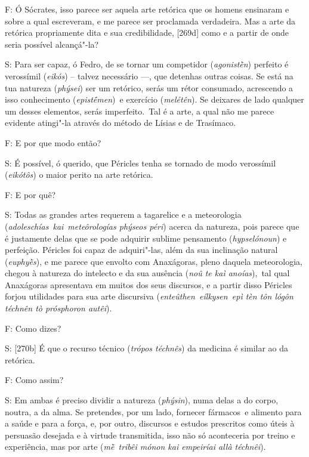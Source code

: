  

F: Ó Sócrates, isso parece ser aquela arte retórica que os homens
ensinaram e sobre a qual escreveram, e me parece ser proclamada
verdadeira. Mas a arte da retórica propriamente dita e sua
credibilidade, [269d] como e a partir de onde seria possível
alcançá"-la?

 

S: Para ser capaz, ó Fedro, de se tornar um competidor
(\emph{agonistḕn}) perfeito é verossímil (\emph{eikós}) -- talvez
necessário \mbox{---,} que detenhas outras coisas. Se está na tua natureza
(\emph{phýsei}) ser um retórico, serás um rétor consumado, acrescendo a
isso conhecimento (\emph{epistḗmen})\emph{~}e exercício
(\emph{melétên}). Se deixares de lado qualquer um desses elementos,
serás imperfeito.~Tal é a arte, a qual não me parece evidente atingi"-la
através do método de Lísias e de Trasímaco.

 

F: E por que modo então?

 

S: É possível, ó querido, que Péricles tenha se tornado de modo
verossímil (\emph{eikótôs}) o maior perito na arte retórica.

 

F: E por quê?

 

S: Todas as grandes artes requerem a tagarelice e a meteorologia
(\emph{adoleschías}~\emph{kai}~\emph{meteôrologías phýseos péri}) acerca
da natureza, pois parece que é justamente delas que se pode adquirir
sublime pensamento (\emph{hypselónoun}) e perfeição. Péricles foi capaz
de adquiri"-las, além da sua inclinação natural (\emph{euphyḕs}), e me
parece que envolto com Anaxágoras, pleno daquela meteorologia, chegou à
natureza do intelecto e da sua ausência (\emph{noû te kaì anoías}),~tal
qual Anaxágoras apresentava em muitos dos seus discursos, e a partir
disso Péricles forjou utilidades para sua arte discursiva
(\emph{enteûthen~eílkysen~epì tèn tôn lógôn téchnên tò prósphoron
autêi}).

 

F: Como dizes?

 

S: [270b] É que o recurso técnico (\emph{trópos téchnês}) da
medicina é similar ao da retórica.

 

F: Como assim?

 

S: Em ambas é preciso dividir a natureza (\emph{phýsin}), numa delas a
do corpo, noutra, a da alma. Se pretendes, por um lado, fornecer
fármacos\emph{~}e alimento para a saúde e para a força, e, por outro,
discursos e estudos prescritos como úteis à persuasão desejada e à
virtude transmitida, isso não só aconteceria por treino e experiência,
mas por arte (\emph{mḕ~tribêi mónon kai empeiríai allà téchnêi}).

